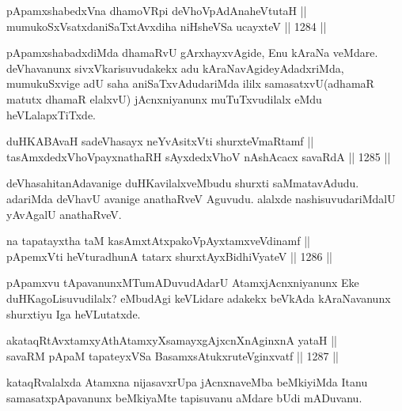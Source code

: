 \begin{shl}
pApamxshabedxVna dhamoVR\s pi deVhoVpAdAnaheVtutaH || \\
mumukoSxVsatxdaniSaTxtAvxdiha niHsheVSa ucayxteV \hfill || 1284 ||  
\end{shl}

\begin{artha}
pApamxshabadxdiMda dhamaRvU gArxhayxvAgide, Enu kAraNa veMdare. deVhavanunx sivxVkarisuvudakekx adu kAraNavAgideyAdadxriMda, mumukuSxvige adU saha aniSaTxvAdudariMda ililx samasatxvU(adhamaR matutx dhamaR elalxvU) jAcnxniyanunx muTuTxvudilalx eMdu heVLalapxTiTxde.
\end{artha}


\begin{shl}
duHKABAvaH sadeVhasayx neYvAsitxVti shurxteVmaRtamf || \\
tasAmxdedxVhoV\s payxnathaRH sAyxdedxVhoV nAshAcacx savaRdA \hfill || 1285 ||  
\end{shl}

\begin{artha}
deVhasahitanAdavanige duHKavilalxveMbudu shurxti saMmatavAdudu. adariMda deVhavU avanige anathaRveV Aguvudu. alalxde nashisuvudariMdalU yAvAgalU anathaRveV.
\end{artha}


\begin{shl}
na tapatayxtha taM kasAmxtAtxpakoV\s pAyxtamxveVdinamf ||  \\
pApemxVti heVturadhunA tatarx shurxtAyx\s BidhiVyateV \hfill || 1286 ||  
\end{shl}

\begin{artha}
pApamxvu tApavanunxMTumADuvudAdarU AtamxjAcnxniyanunx Eke duHKagoLisuvudilalx? eMbudAgi keVLidare adakekx beVkAda kAraNavanunx shurxtiyu Iga heVLutatxde.
\end{artha}

\begin{shl}
akataqRtAvxtamxyAthAtamxyXsamayxgAjxcnXnAginxnA yataH || \\
savaRM pApaM tapateyxVSa BasamxsAtukxruteV\s ginxvatf \hfill || 1287 ||  
\end{shl}

\begin{artha}
kataqRvalalxda Atamxna nijasavxrUpa jAcnxnaveMba beMkiyiMda Itanu samasatxpApavanunx beMkiyaMte tapisuvanu aMdare bUdi mADuvanu.
\end{artha}

